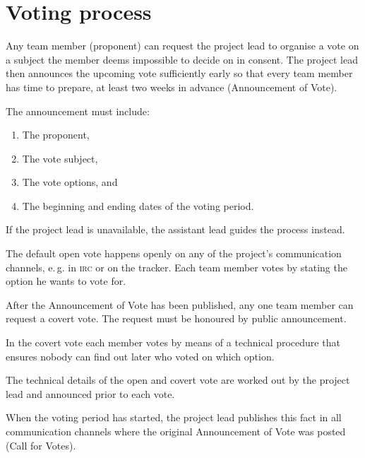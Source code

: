 \documentclass[10pt,a4paper,DIV=calc,headings=medium,twocolumn,final]{scrartcl}
\newcommand\irc{\textsc{irc}\xspace}
\newcommand\eg{e.\,g.\xspace}
\begin{document}
\section{Voting process}

\begin{contract}

  \label{cl:voting}

  Any team member (proponent) can request the project lead to organise
  a vote on a subject the member deems impossible to decide on in
  consent. The project lead then announces the upcoming vote
  sufficiently early so that every team member has time to prepare, at
  least two weeks in advance (Announcement of Vote).

  The announcement must include:

  \begin{enumerate}
  \item The proponent,
  \item The vote subject,
  \item The vote options, and
  \item The beginning and ending dates of the voting period.
  \end{enumerate}

  If the project lead is unavailable, the assistant lead guides the
  process instead.


  The default open vote happens openly on any of the project’s
  communication channels, \eg in \irc or on the tracker. Each team
  member votes by stating the option he wants to vote for.


  After the Announcement of Vote has been published, any one team
  member can request a covert vote. The request must be honoured by
  public announcement.

  In the covert vote each member votes by means of a technical
  procedure that ensures nobody can find out later who voted on which
  option.


  The technical details of the open and covert vote are worked out by
  the project lead and announced prior to each vote.


  When the voting period has started, the project lead publishes this
  fact in all communication channels where the original Announcement
  of Vote was posted (Call for Votes).


\end{contract}
\end{document}
